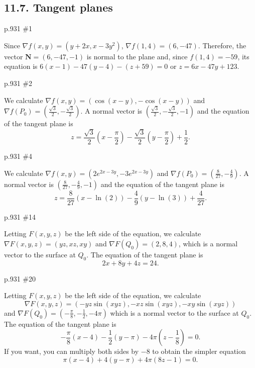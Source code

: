 \subsection*{11.7. Tangent planes}
\begin{practice}p.931 \#1\end{practice}
\begin{pracsol}
  Since $\nabla f(x,y)=(y+2x,x-3y^2)$, $\nabla f(1,4)=(6,-47)$. Therefore, the vector $\mathbf N=(6,-47,-1)$ is normal to the plane and, since $f(1,4)=-59$, its equation is $6(x-1)-47(y-4)-(z+59)=0$ or $z=6x-47y+123$.
\end{pracsol}
\begin{practice}p.931 \#2\end{practice}
\begin{pracsol}
  We calculate $\nabla f(x,y)=(\cos(x-y),-\cos(x-y))$ and $\nabla f(P_0)=\left(\frac{\sqrt3}2,-\frac{\sqrt3}2\right)$. A normal vector is $\left(\frac{\sqrt3}2,-\frac{\sqrt3}2,-1\right)$ and the equation of the tangent plane is
  \[z=\frac{\sqrt3}2\left(x-\frac{\pi}2\right)-\frac{\sqrt3}2\left(y-\frac{\pi}2\right)+\frac12.\]
\end{pracsol}
\begin{practice}p.931 \#4\end{practice}
\begin{pracsol}
  We calculate $\nabla f(x,y)=(2e^{2x-3y},-3e^{2x-3y})$ and $\nabla f(P_0)=\left(\frac8{27},-\frac49\right)$. A normal vector is $\left(\frac8{27},-\frac49,-1\right)$ and the equation of the tangent plane is
  \[z=\frac8{27}(x-\ln(2))-\frac49(y-\ln(3))+\frac4{27}.\]
\end{pracsol}
\begin{practice}p.931 \#14\end{practice}
\begin{pracsol}
  Letting $F(x,y,z)$ be the left side of the equation, we calculate $\nabla F(x,y,z)=(yz,xz,xy)$ and $\nabla F(Q_0)=(2,8,4)$, which is a normal vector to the surface at $Q_0$. The equation of the tangent plane is
  \[2x+8y+4z=24.\]
\end{pracsol}
\begin{practice}p.931 \#20\end{practice}
\begin{pracsol}
  Letting $F(x,y,z)$ be the left side of the equation, we calculate
  \[\nabla F(x,y,z)=(-yz\sin(xyz),-xz\sin(xyz),-xy\sin(xyz))\]
  and $\nabla F(Q_0)=\left(-\frac{\pi}8,-\frac12,-4\pi\right)$ which is a normal vector to the surface at $Q_0$. The equation of the tangent plane is
  \[-\frac{\pi}8(x-4)-\frac12(y-\pi)-4\pi\left(z-\frac18\right)=0.\]
  If you want, you can multiply both sides by $-8$ to obtain the simpler equation
  \[\pi(x-4)+4(y-\pi)+4\pi\left(8z-1\right)=0.\]
\end{pracsol}

